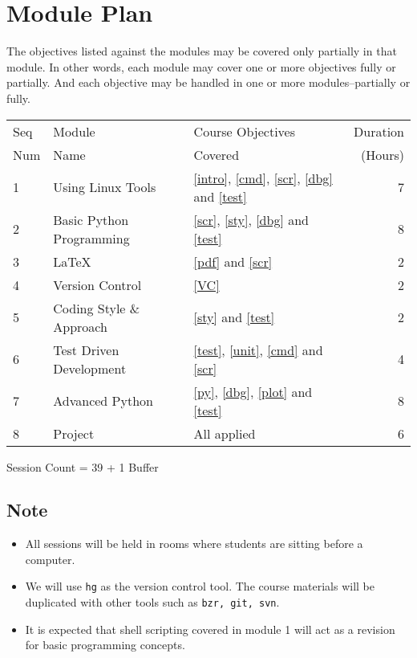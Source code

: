 \documentclass{article}
\begin{document}
\section{Module Plan}
The objectives listed against the modules may be covered only partially in that module. In other words, each module may cover one or more objectives fully or partially. And each objective may be handled in one or more modules--partially or fully. 

\begin{tabular}{||l|l|l|r||}\hline\hline
Seq & Module  & Course Objectives & Duration\\
Num & Name    & Covered           & (Hours)\\\hline 
1 & Using Linux Tools        & \ref{intro}, \ref{cmd}, \ref{scr}, \ref{dbg} and  \ref{test} & 7\\\hline
2 & Basic Python Programming & \ref{scr}, \ref{sty}, \ref{dbg} and \ref{test}               & 8\\\hline 
3 & LaTeX                    & \ref{pdf} and \ref{scr}                                      & 2\\\hline
4 & Version Control          & \ref{VC}                                                     & 2\\\hline
5 & Coding Style \& Approach & \ref{sty} and \ref{test}                                     & 2\\\hline
6 & Test Driven Development  & \ref{test}, \ref{unit}, \ref{cmd} and \ref{scr}              & 4\\\hline
7 & Advanced Python          & \ref{py}, \ref{dbg}, \ref{plot} and \ref{test}               & 8\\\hline
8 & Project                  & All applied                                                  & 6\\\hline
\end{tabular}    

Session Count = 39 + 1 Buffer
\subsection*{Note}
\begin{itemize}
    \item All sessions will be held in rooms where students are sitting before a computer.
    \item We will use \texttt{hg} as the version control tool. The course materials will be duplicated with other tools
          such as \texttt{bzr, git, svn}.
    \item It is expected that shell scripting covered in module 1 will act as a revision for basic programming
      concepts.
\end{itemize}     
\end{document}
